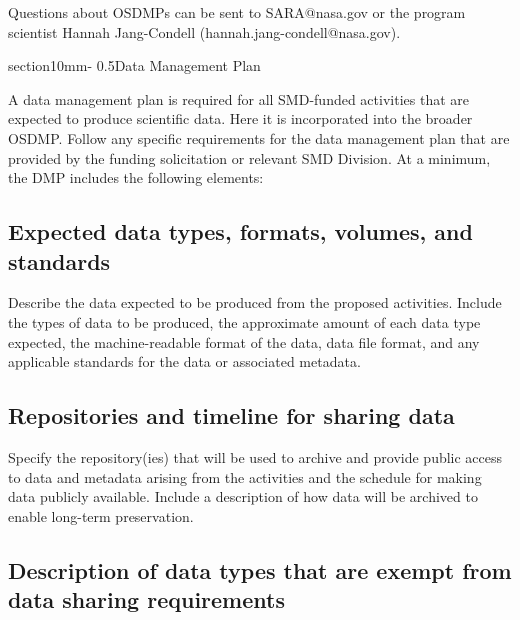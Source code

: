 \documentclass[letterpaper,12pt]{article}
\makeatletter
\renewcommand{\section}{\@startsection%
{section}{1}{0mm}{-\baselineskip}%
{0.5\baselineskip}{\normalfont\Large\bfseries}}%
\makeatother
\begin{document}
Questions about OSDMPs can be sent to SARA@nasa.gov or the program scientist Hannah Jang-Condell (hannah.jang-condell@nasa.gov).



\section{Data Management Plan}

A data management plan is required for all SMD-funded activities that are expected to produce scientific data. Here it is incorporated into the broader OSDMP. Follow any specific requirements for the data management plan that are provided by the funding solicitation or relevant SMD Division. At a minimum, the DMP includes the following elements:

\subsection{Expected data types, formats, volumes, and standards}

Describe the data expected to be produced from the proposed activities. Include the types of data to be produced, the approximate amount of each data type expected, the machine-readable format of the data, data file format, and any applicable standards for the data or associated metadata.

\subsection{Repositories and timeline for sharing data}

Specify the repository(ies) that will be used to archive and provide public access to data and metadata arising from the activities and the schedule for making data publicly available. Include a description of how data will be archived to enable long-term preservation.

\subsection{Description of data types that are exempt from data sharing requirements}
\end{document}
